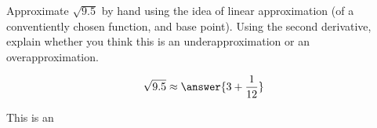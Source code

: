 \documentclass{ximera}
\author{Steven Gubkin}
\begin{document}
\begin{exercise}

Approximate $\sqrt{9.5}$ by hand using the idea of linear approximation (of a conventiently chosen function, and base point).  Using the second derivative, explain whether you think this is an underapproximation or an overapproximation.

\begin{prompt}
	$$\sqrt{9.5} \approx \answer{3+\frac{1}{12}}$$

This is an
\begin{multipleChoice}
\end{multipleChoice}
\end{prompt}

\end{exercise}
\end{document}

